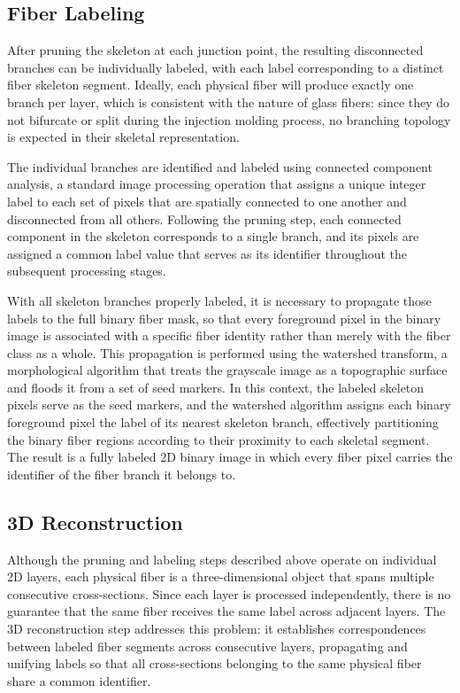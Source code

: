 \subsection{Fiber Labeling}

After pruning the skeleton at each junction point, the resulting disconnected branches can be individually labeled, with each label corresponding to a distinct fiber skeleton segment. Ideally, each physical fiber will produce exactly one branch per layer, which is consistent with the nature of glass fibers: since they do not bifurcate or split during the injection molding process, no branching topology is expected in their skeletal representation.

The individual branches are identified and labeled using connected component analysis, a standard image processing operation that assigns a unique integer label to each set of pixels that are spatially connected to one another and disconnected from all others. Following the pruning step, each connected component in the skeleton corresponds to a single branch, and its pixels are assigned a common label value that serves as its identifier throughout the subsequent processing stages.

With all skeleton branches properly labeled, it is necessary to propagate those labels to the full binary fiber mask, so that every foreground pixel in the binary image is associated with a specific fiber identity rather than merely with the fiber class as a whole. This propagation is performed using the watershed transform, a morphological algorithm that treats the grayscale image as a topographic surface and floods it from a set of seed markers. In this context, the labeled skeleton pixels serve as the seed markers, and the watershed algorithm assigns each binary foreground pixel the label of its nearest skeleton branch, effectively partitioning the binary fiber regions according to their proximity to each skeletal segment. The result is a fully labeled 2D binary image in which every fiber pixel carries the identifier of the fiber branch it belongs to.

\subsection{3D Reconstruction}

Although the pruning and labeling steps described above operate on individual 2D layers, each physical fiber is a three-dimensional object that spans multiple consecutive cross-sections. Since each layer is processed independently, there is no guarantee that the same fiber receives the same label across adjacent layers. The 3D reconstruction step addresses this problem: it establishes correspondences between labeled fiber segments across consecutive layers, propagating and unifying labels so that all cross-sections belonging to the same physical fiber share a common identifier.

